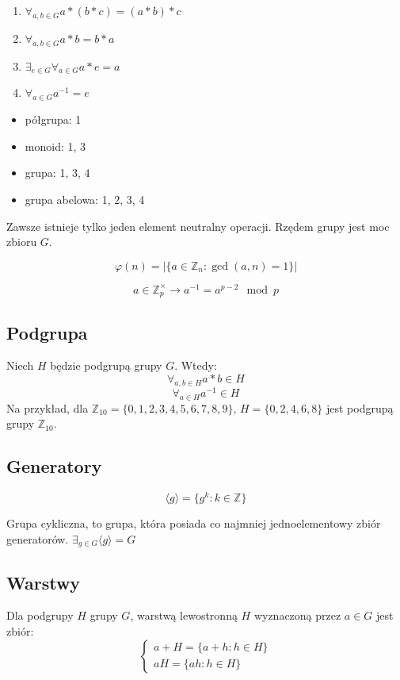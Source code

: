 \documentclass{../notatki}
\begin{document}
\begin{enumerate}
  \item $\forall_{a, b \in G} a * (b * c) = (a * b) * c$
  \item $\forall_{a, b \in G} a * b = b * a$
  \item $\exists_{e \in G} \forall_{a \in G} a * e = a$
  \item $\forall_{a \in G} a^{-1} = e$
\end{enumerate}

\begin{itemize}
  \item półgrupa: 1
  \item monoid: 1, 3
  \item grupa: 1, 3, 4
  \item grupa abelowa: 1, 2, 3, 4
\end{itemize}

Zawsze istnieje tylko jeden element neutralny operacji.
Rzędem grupy jest moc zbioru $G$.

$$\varphi(n) = |\{a \in \mathbb{Z}_n : \gcd(a, n) = 1\}|$$

$$
a \in \mathbb{Z}_p^\times \rightarrow a^{-1} = a^{p-2} \mod p
$$

\subsection{Podgrupa}

Niech $H$ będzie podgrupą grupy $G$. Wtedy:
$$
\forall_{a, b \in H} a * b \in H
$$
$$
\forall_{a \in H} a^{-1} \in H
$$
Na przykład, dla $\mathbb{Z}_{10} = \{0, 1, 2, 3, 4, 5, 6, 7, 8, 9\}$,
$H = \{0, 2, 4, 6, 8\}$ jest podgrupą grupy $\mathbb{Z}_{10}$.

\subsection{Generatory}

$$
\langle g \rangle = \{g^k : k \in \mathbb{Z}\}
$$

Grupa cykliczna, to grupa, która posiada co najmniej jednoelementowy zbiór
generatorów. $\exists_{g \in G} \langle g \rangle = G$

\subsection{Warstwy}

Dla podgrupy $H$ grupy $G$, warstwą lewostronną $H$ wyznaczoną przez
$a \in G$ jest zbiór:
$$
\begin{cases}
  a + H = \{a + h : h \in H\}\\
  aH = \{ah : h \in H\}
\end{cases}
$$
\end{document}
